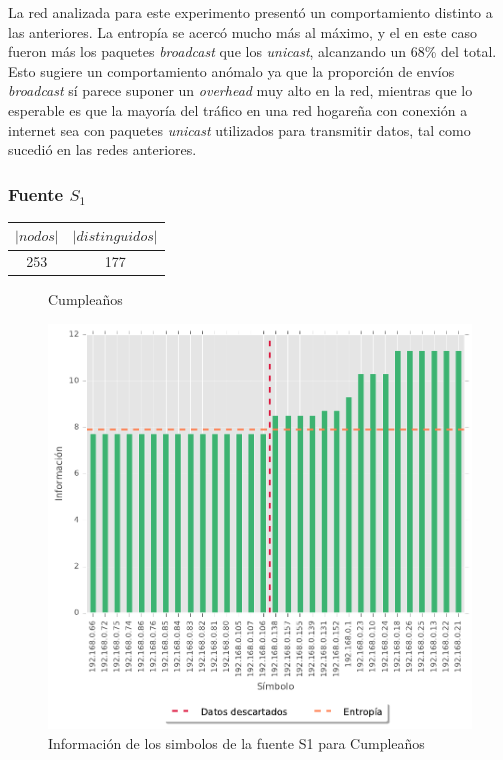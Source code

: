 La red analizada para este experimento presentó un comportamiento distinto a las anteriores. La entropía se acercó mucho más al máximo, y el en este caso fueron más los paquetes \textit{broadcast} que los \textit{unicast}, alcanzando un 68\% del total. Esto sugiere un comportamiento anómalo ya que la proporción de envíos \textit{broadcast} sí parece suponer un \textit{overhead} muy alto en la red, mientras que lo esperable es que la mayoría del tráfico en una red hogareña con conexión a internet sea con paquetes \textit{unicast} utilizados para transmitir datos, tal como sucedió en las redes anteriores.

\subsubsection{Fuente $S_1$}

\begin{center}\small
	\begin{tabular}{ c | c }
	  $|nodos|$ & $|distinguidos|$ \\
	  \hline
	  253 & 177 \\
	\end{tabular}
\end{center}

\begin{figure}[H]
	\centering
	\caption{Cumpleaños}
	
    \label{grafo_cumple}
\end{figure}

\begin{figure}[H]
  \begin{center}
    \includegraphics[scale = 0.5]{img/Cumple-information-S1.pdf}
    \caption{Información de los simbolos de la fuente S1 para Cumpleaños}
    \label{informacion_cumple}
  \end{center}
\end{figure}

